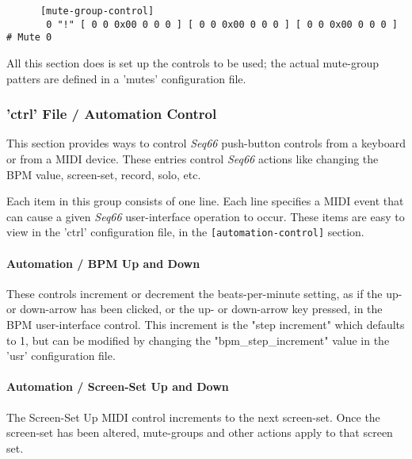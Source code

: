    \begin{verbatim}
      [mute-group-control]
       0 "!" [ 0 0 0x00 0 0 0 ] [ 0 0 0x00 0 0 0 ] [ 0 0 0x00 0 0 0 ]  # Mute 0
   \end{verbatim}

   All this section does is set up the controls to be used; the actual
   mute-group patters are defined in a 'mutes' configuration file.

\subsubsection{'ctrl' File / Automation Control}
\label{subsubsec:configuration_midi_ctrl_automation}

   This section provides ways to control \textsl{Seq66} push-button controls
   from a keyboard or from a MIDI device.
   These entries control
   \textsl{Seq66} actions like changing the BPM value, screen-set,
   record, solo, etc.
   
   Each item in this group consists of one line.  Each line
   specifies a MIDI event that can cause a given
   \textsl{Seq66} user-interface operation to occur.
   These items are easy to view in the 'ctrl' configuration file,
   in the \texttt{[automation-control]} section.

\paragraph{Automation / BPM Up and Down}
\label{paragraph:configuration_midi_ctrl_bpmupdn}

   These controls increment or decrement the beats-per-minute setting, as if
   the up- or down-arrow has been clicked, or the up- or down-arrow key pressed,
   in the BPM user-interface control.
   This increment is the
   "step increment" which defaults to 1, but can be modified by
   changing the "bpm\_step\_increment" value in the 'usr'
   configuration file.


\paragraph{Automation / Screen-Set Up and Down}
\label{paragraph:configuration_midi_ctrl_ssupdn}

   The Screen-Set Up MIDI control increments to the next screen-set. 
   Once the screen-set has been altered, mute-groups and other
   actions apply to that screen set.

